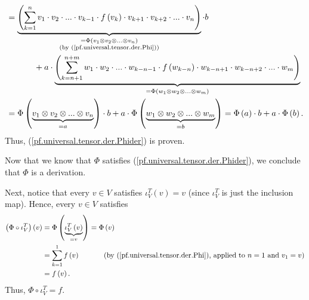 \documentclass[etingof-lie.tex]{subfiles}
\begin{document}
\begin{align*}
&  =\underbrace{\left(  \sum\limits_{k=1}^{n}v_{1}\cdot v_{2}\cdot...\cdot
v_{k-1}\cdot f\left(  v_{k}\right)  \cdot v_{k+1}\cdot v_{k+2}\cdot...\cdot
v_{n}\right)  }_{\substack{=\Phi\left(  v_{1}\otimes v_{2}\otimes...\otimes
v_{n}\right)  \\\text{(by (\ref{pf.universal.tensor.der.Phi}))}}}\cdot b\\
&  \ \ \ \ \ \ \ \ \ \ +a\cdot\underbrace{\left(  \sum\limits_{k=n+1}%
^{n+m}w_{1}\cdot w_{2}\cdot...\cdot w_{k-n-1}\cdot f\left(  w_{k-n}\right)
\cdot w_{k-n+1}\cdot w_{k-n+2}\cdot...\cdot w_{m}\right)  }_{=\Phi\left(
w_{1}\otimes w_{2}\otimes...\otimes w_{m}\right)  }\\
&  =\Phi\left(  \underbrace{v_{1}\otimes v_{2}\otimes...\otimes v_{n}}%
_{=a}\right)  \cdot b+a\cdot\Phi\left(  \underbrace{w_{1}\otimes w_{2}%
\otimes...\otimes w_{m}}_{=b}\right)  =\Phi\left(  a\right)  \cdot
b+a\cdot\Phi\left(  b\right)  .
\end{align*}
Thus, (\ref{pf.universal.tensor.der.Phider}) is proven.

Now that we know that $\Phi$ satisfies (\ref{pf.universal.tensor.der.Phider}),
we conclude that $\Phi$ is a derivation.

Next, notice that every $v\in V$ satisfies $\iota_{V}^{T}\left(  v\right)  =v$
(since $\iota_{V}^{T}$ is just the inclusion map). Hence, every $v\in V$
satisfies%
\begin{align*}
\left(  \Phi\circ\iota_{V}^{T}\right)  \left(  v\right)   &  =\Phi\left(
\underbrace{\iota_{V}^{T}\left(  v\right)  }_{\substack{=v}}\right)
=\Phi\left(  v\right) \\
&  =\sum\limits_{k=1}^{1}f\left(  v\right)  \ \ \ \ \ \ \ \ \ \ \left(
\text{by (\ref{pf.universal.tensor.der.Phi}), applied to }n=1\text{ and }%
v_{1}=v\right) \\
&  =f\left(  v\right)  .
\end{align*}
Thus, $\Phi\circ\iota_{V}^{T}=f$.
\end{document}
